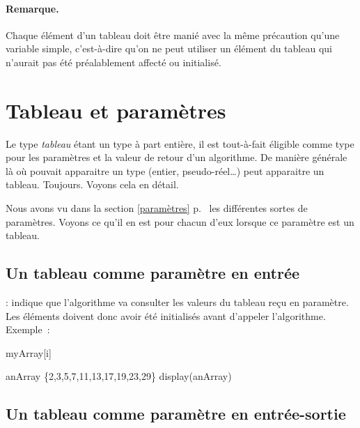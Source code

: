 	\paragraph{Remarque.} Chaque élément d’un tableau doit être manié avec la
	même précaution qu’une variable simple, c’est-à-dire qu’on ne peut utiliser
	un élément du tableau qui n’aurait pas été préalablement affecté ou
	initialisé.

		

	\section{Tableau et paramètres}
	
		Le type \emph{tableau} étant un type à part entière, il est tout-à-fait
		éligible comme type pour les paramètres et la valeur de retour d’un
		algorithme.  De manière générale là où pouvait apparaitre un type
		(entier, pseudo-réel…) peut apparaitre un tableau.  Toujours.  Voyons
		cela en détail.  

		Nous avons vu dans la section \ref{paramètres} p.~\pageref{paramètres}
		les différentes sortes de paramètres. Voyons ce qu'il en est pour
		chacun d'eux lorsque ce paramètre est un tableau. 


		\subsection{Un tableau comme paramètre en entrée}
				
		\In : indique que l’algorithme va consulter les valeurs du tableau reçu
		en paramètre.  Les éléments doivent donc avoir été initialisés avant
		d’appeler l’algorithme. Exemple~:
			
		\begin{pseudocode}
					\Write myArray[i]
				\EndFor
			\EndAlgo 

			\Empty
			\Let anArray \Gets \{2,3,5,7,11,13,17,19,23,29\}
			\Stmt display(anArray)
		\end{pseudocode}
	

		\subsection{Un tableau comme paramètre en entrée-sortie}

